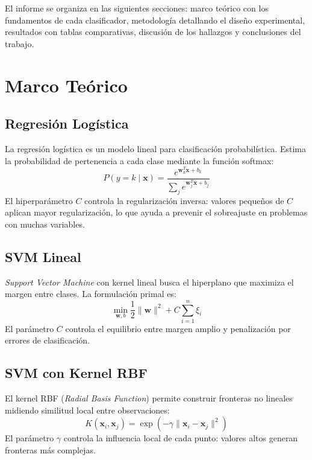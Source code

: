 \documentclass[conference]{IEEEtran}
\begin{document}
El informe se organiza en las siguientes secciones: marco teórico con los fundamentos de cada clasificador, metodología detallando el diseño experimental, resultados con tablas comparativas, discusión de los hallazgos y conclusiones del trabajo.

\section{Marco Teórico}

\subsection{Regresión Logística}
La regresión logística es un modelo lineal para clasificación probabilística. Estima la probabilidad de pertenencia a cada clase mediante la función softmax:
\begin{equation}
P(y = k \mid \mathbf{x}) = \frac{e^{\mathbf{w}_k^T \mathbf{x} + b_k}}{\sum_{j} e^{\mathbf{w}_j^T \mathbf{x} + b_j}}
\end{equation}
El hiperparámetro \(C\) controla la regularización inversa: valores pequeños de \(C\) aplican mayor regularización, lo que ayuda a prevenir el sobreajuste en problemas con muchas variables.

\subsection{SVM Lineal}
\textit{Support Vector Machine} con kernel lineal busca el hiperplano que maximiza el margen entre clases. La formulación primal es:
\begin{equation}
\min_{\mathbf{w}, b} \frac{1}{2} \|\mathbf{w}\|^2 + C \sum_{i=1}^{n} \xi_i
\end{equation}
El parámetro \(C\) controla el equilibrio entre margen amplio y penalización por errores de clasificación.

\subsection{SVM con Kernel RBF}
El kernel RBF (\textit{Radial Basis Function}) permite construir fronteras no lineales midiendo similitud local entre observaciones:
\begin{equation}
K(\mathbf{x}_i, \mathbf{x}_j) = \exp(-\gamma \|\mathbf{x}_i - \mathbf{x}_j\|^2)
\end{equation}
El parámetro \(\gamma\) controla la influencia local de cada punto: valores altos generan fronteras más complejas.
\end{document}
